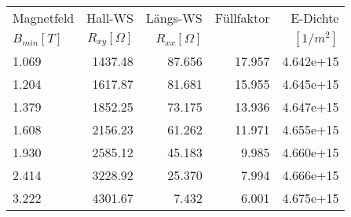 \begin{tabular}{lrrrr}
\toprule
 Magnetfeld& Hall-WS & Längs-WS & Füllfaktor & E-Dichte \\
 $B_{min}[T]$ &    $R_{xy} [\Omega]$ 	&  $R_{xx}[\Omega]$ 	&  &$[1/m^2]$\\
\midrule
  1.069 &   1437.48 &   87.656 	&       17.957 &         4.642e+15 \\
  1.204 &   1617.87 &   81.681 	&       15.955 &         4.645e+15 \\
  1.379 &   1852.25 &   73.175 	&       13.936 &         4.647e+15 \\
  1.608 &  2156.23 	&   61.262 	&       11.971 &         4.655e+15 \\
  1.930 & 2585.12 	&    45.183 &        9.985 &         4.660e+15 \\
  2.414 &   3228.92 &    25.370 &        7.994 &         4.666e+15 \\
  3.222 &   4301.67 &     7.432 &        6.001 &         4.675e+15 \\
\bottomrule
\end{tabular}
